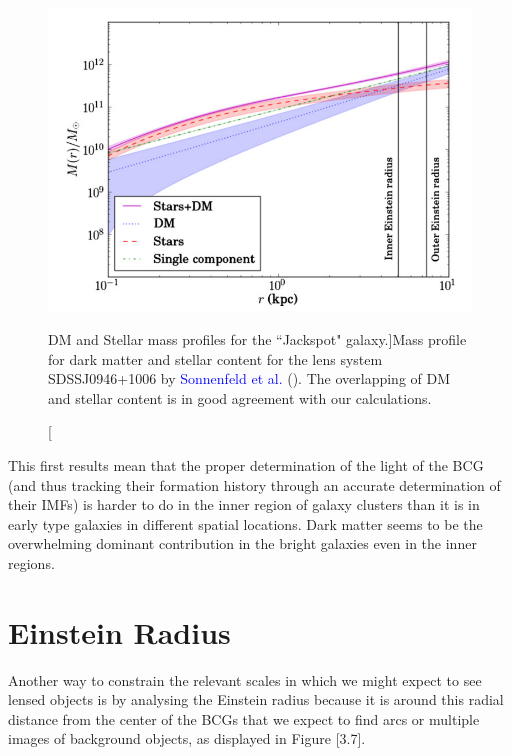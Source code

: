 \begin{figure}[H]
\centering
\includegraphics[width=12cm]{images/sonnenfeld_galaxy.png}
\caption[DM and Stellar mass profiles for the ``Jackspot" galaxy.]{Mass profile for dark matter and stellar content for the lens system SDSSJ0946+1006  by \textcolor{blue}{Sonnenfeld et al.} (\citeyear{Reference15}). The overlapping of DM and stellar content is in good agreement with our calculations.}
\end{figure}

This first results mean that the proper determination of the light of the BCG (and thus tracking their formation history through an accurate determination of their IMFs) is harder to do in the inner region of galaxy clusters than it is in early type galaxies in different spatial locations. Dark matter seems to be the overwhelming dominant contribution in the bright galaxies even in the inner regions.

\section{Einstein Radius}

Another way to constrain the relevant scales in which we might expect to see lensed objects is by analysing the Einstein radius because it is around this radial distance from the center of the BCGs that we expect to find arcs or multiple images of background objects, as displayed in Figure [3.7]. 

